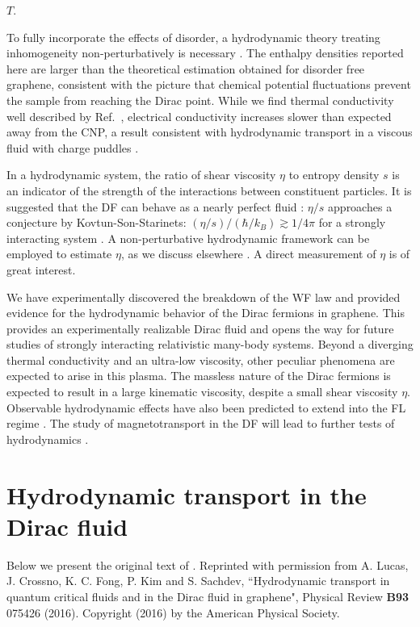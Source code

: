 \documentclass[10pt, oneside]{book}
\begin{document}
\begin{doublespace}
$T$. \color{black}

To fully incorporate the effects of disorder, a hydrodynamic theory treating inhomogeneity non-perturbatively  is necessary  \cite{Lucas:2015lna, Lucas:2015sya}. The enthalpy densities reported here are larger than the theoretical estimation obtained for disorder free graphene, consistent with the picture that chemical potential fluctuations prevent the sample from reaching the Dirac point. 
While we find thermal conductivity well described by Ref.~\cite{muller2009, foster}, electrical conductivity increases slower than expected away from the CNP,  a result consistent with hydrodynamic transport in a viscous fluid with charge puddles \cite{Lucas:2015sya}.

In a hydrodynamic system, the ratio of shear viscosity $\eta$ to entropy density $s$ is an indicator of the strength of the interactions between constituent particles.   It is suggested that the DF can behave as a nearly perfect fluid \cite{muller2009}: $\eta/s$ approaches a conjecture by Kovtun-Son-Starinets: $(\eta/s)/(\hbar/k_B) \gtrsim 1/4\pi$ for a strongly interacting system \cite{Kovtun:2004de}.  A non-perturbative hydrodynamic framework can be employed to estimate $\eta$, as we discuss elsewhere \cite{Lucas:2015lna}.   A direct measurement of $\eta$ is of great interest.  


We have experimentally discovered the breakdown of the WF law and provided evidence for the hydrodynamic behavior of the Dirac fermions in graphene. This provides an experimentally realizable Dirac fluid and opens the way for future studies of strongly interacting relativistic many-body systems. Beyond a diverging thermal conductivity and an ultra-low viscosity, other peculiar phenomena are expected to arise in this plasma. The massless nature of the Dirac fermions is expected to result in a large kinematic viscosity, despite  a small shear viscosity $\eta$.   Observable hydrodynamic effects have also been predicted to extend into the FL regime \cite{vignale}.  The study of magnetotransport in the DF will lead to further tests of hydrodynamics \cite{muller2,hkms}.



\chapter{Hydrodynamic transport in the Dirac fluid}

Below we present the original text of \cite{Lucas:2015sya}.  Reprinted with permission from A. Lucas, J. Crossno, K. C. Fong, P. Kim and S. Sachdev,  ``Hydrodynamic transport in quantum critical fluids and in the Dirac fluid in graphene",  Physical Review \textbf{B93} 075426 (2016).   Copyright (2016) by the American Physical Society.


\end{doublespace}
\end{document}
